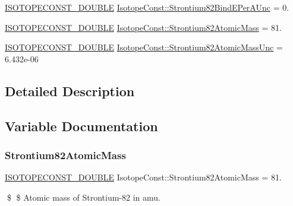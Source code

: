 \begin{DoxyCompactItemize}
\mbox{\hyperlink{group___isotope_const-_macros_ga8f45a7272ce02c0b4c65c44636ed719a}{I\+S\+O\+T\+O\+P\+E\+C\+O\+N\+S\+T\+\_\+\+D\+O\+U\+B\+LE}} \mbox{\hyperlink{group___isotope_const-_strontium-_sr82_gadfd639c5c3882cb288386da14576736d}{Isotope\+Const\+::\+Strontium82\+Bind\+E\+Per\+A\+Unc}} = 0.
\item 
\mbox{\hyperlink{group___isotope_const-_macros_ga8f45a7272ce02c0b4c65c44636ed719a}{I\+S\+O\+T\+O\+P\+E\+C\+O\+N\+S\+T\+\_\+\+D\+O\+U\+B\+LE}} \mbox{\hyperlink{group___isotope_const-_strontium-_sr82_ga7476c87b7906aeeac6c4c33c1ec9ac92}{Isotope\+Const\+::\+Strontium82\+Atomic\+Mass}} = 81.
\item 
\mbox{\hyperlink{group___isotope_const-_macros_ga8f45a7272ce02c0b4c65c44636ed719a}{I\+S\+O\+T\+O\+P\+E\+C\+O\+N\+S\+T\+\_\+\+D\+O\+U\+B\+LE}} \mbox{\hyperlink{group___isotope_const-_strontium-_sr82_gaac84b20780c316af71512f049acf46e9}{Isotope\+Const\+::\+Strontium82\+Atomic\+Mass\+Unc}} = 6.\+432e-\/06
\end{DoxyCompactItemize}


\subsection{Detailed Description}


\subsection{Variable Documentation}
\mbox{\label{group___isotope_const-_strontium-_sr82_ga7476c87b7906aeeac6c4c33c1ec9ac92}} 
\subsubsection{\texorpdfstring{Strontium82\+Atomic\+Mass}{Strontium82AtomicMass}}
{\footnotesize\ttfamily \mbox{\hyperlink{group___isotope_const-_macros_ga8f45a7272ce02c0b4c65c44636ed719a}{I\+S\+O\+T\+O\+P\+E\+C\+O\+N\+S\+T\+\_\+\+D\+O\+U\+B\+LE}} Isotope\+Const\+::\+Strontium82\+Atomic\+Mass = 81.}

\$ \$ Atomic mass of Strontium-\/82 in amu. \mbox{\label{group___isotope_const-_strontium-_sr82_gaac84b20780c316af71512f049acf46e9}} 
